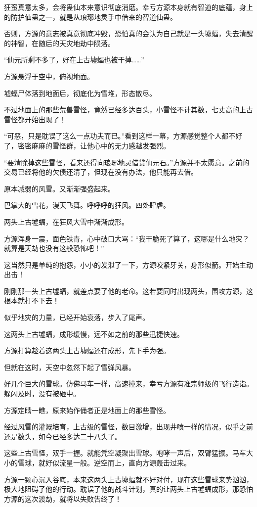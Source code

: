 \begin{this_body}
狂蛮真意太多，会将蛊仙本来意识彻底消磨。幸亏方源本身就有智道的底蕴，身上的防护仙蛊之一，就是从琅琊地灵手中借来的智道仙蛊。

否则，方源的意志被真意彻底冲毁，恐怕真的会认为自己就是一头墟蝠，失去清醒的神智，在随后的天灾地劫中陨落。

“仙元所剩不多了，好在上古墟蝠也被干掉……”

方源悬浮于空中，俯视地面。

墟蝠尸体落到地面后，彻底化为雪堆，形态散尽。

不过地面上的那些荒兽雪怪，竟然已经多达百头，小雪怪不计其数，七丈高的上古雪怪都开始出现了！

“可恶，只是耽误了这么一点功夫而已。”看到这样一幕，方源感觉整个人都不好了，密密麻麻的雪怪群，让他心中的无力感越发强烈。

“要清除掉这些雪怪，看来还得向琅琊地灵借贷仙元石。”方源并不太愿意。之前的交易已经将他的欠债还清了，但现在没有办法，他只能再去借。

原本减弱的风雪。又渐渐强盛起来。

巴掌大的雪花，漫天飞舞。呼呼呼的狂风。四处肆虐。

两头上古墟蝠，在狂风大雪中渐渐成形。

方源浑身一震，面色铁青，心中破口大骂：“我干脆死了算了，这哪是什么地灾？就算是天劫也没有这般恐怖吧！”

这当然只是单纯的抱怨，小小的发泄了一下，方源咬紧牙关，身形似箭。开始主动出击！

刚刚那一头上古墟蝠，就差点要了他的老命。这若要同时出现两头，围攻方源，这根本就打不下去！

似乎地灾的力量，已经开始衰落，步入了尾声。

这两头上古墟蝠，成形缓慢，远不如之前的那些迅捷快速。

方源打算趁着这两头上古墟蝠还在成形，先下手为强。

但就在这时，天空中忽然下起了雪弹风暴。

好几个巨大的雪球。仿佛马车一样，高速撞来，幸亏方源有准宗师级的飞行造诣。躲闪及时，没有被砸中。

方源定睛一瞧，原来始作俑者正是地面上的那些雪怪。

经过风雪的灌溉培育，上古级的雪怪，数目激增，出现井喷一样的情况，似乎之前还是数头，如今已经多达二十八头了。

这些上古雪怪，双手一握。就能凭空凝聚出雪球。咆哮一声后，双臂猛振。马车大小的雪球，就好似流星一般。逆空而上，直向方源轰击过来。

方源一颗心沉入谷底，本来这两头上古墟蝠就不好对付，现在这些雪球来势汹汹，极大地阻碍了他的行动。耽误了他的战斗计划，真的让两头上古墟蝠成形，那恐怕方源的这次渡劫，就将以失败告终了！


\end{this_body}
